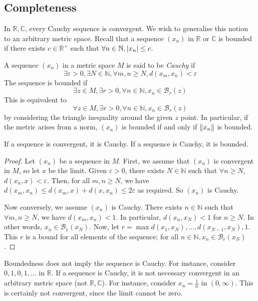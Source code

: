 \subsection{Completeness}
In \( \mathbb R, \mathbb C \), every Cauchy sequence is convergent.
We wish to generalise this notion to an arbitrary metric space.
Recall that a sequence \( (x_n) \) in \( \mathbb R \) or \( \mathbb C \) is bounded if there exists \( c \in \mathbb R^+ \) such that \( \forall n \in \mathbb N, \abs{x_n} \leq c \).
\begin{definition}
	A sequence \( (x_n) \) in a metric space \( M \) is said to be \textit{Cauchy} if
	\[
		\exists \varepsilon > 0, \exists N \in \mathbb N, \forall m,n \geq N, d(x_m,x_n) < \varepsilon
	\]
	The sequence is bounded if
	\[
		\exists z \in M, \exists r > 0, \forall n \in \mathbb N, x_n \in \mathcal B_r(z)
	\]
	This is equivalent to
	\[
		\forall z \in M, \exists r > 0, \forall n \in \mathbb N, x_n \in \mathcal B_r(z)
	\]
	by considering the triangle inequality around the given \( z \) point.
	In particular, if the metric arises from a norm, \( (x_n) \) is bounded if and only if \( \norm{x_n} \) is bounded.
\end{definition}
\begin{lemma}
	If a sequence is convergent, it is Cauchy.
	If a sequence is Cauchy, it is bounded.
\end{lemma}
\begin{proof}
	Let \( (x_n) \) be a sequence in \( M \).
	First, we assume that \( (x_n) \) is convergent in \( M \), so let \( x \) be the limit.
	Given \( \varepsilon > 0 \), there exists \( N \in \mathbb N \) such that \( \forall n \geq N \), \( d(x_n, x) < \varepsilon \).
	Then, for all \( m, n \geq N \), we have \( d(x_m, x_n) \leq d(x_m, x) + d(x, x_n) \leq 2\varepsilon \) as required.
	So \( (x_n) \) is Cauchy.

	Now conversely, we assume \( (x_n) \) is Cauchy.
	There exists \( n \in \mathbb N \) such that \( \forall m, n \geq N \), we have \( d(x_m, x_n) < 1 \).
	In particular, \( d(x_n, x_N) < 1 \) for \( n \geq N \).
	In other words, \( x_n \in \mathcal B_1(x_N) \).
	Now, let \( r = \max{d(x_1, x_N), \dots, d(x_{N-1}, x_N), 1} \).
	This \( r \) is a bound for all elements of the sequence; for all \( n \in \mathbb N, x_n \in \mathcal B_r(x_N) \).
\end{proof}
\begin{remark}
	Boundedness does not imply the sequence is Cauchy.
	For instance, consider \( 0,1,0,1,\dots \) in \( \mathbb R \).
	If a sequence is Cauchy, it is not necessary convergent in an arbitrary metric space (not \( \mathbb R, \mathbb C \)).
	For instance, consider \( x_n = \frac{1}{n} \) in \( (0, \infty) \).
	This is certainly not convergent, since the limit cannot be zero.
\end{remark}
